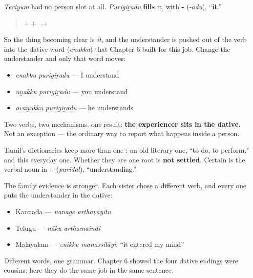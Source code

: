 \begin{grammarlens}[title={Grammar Lens: the last slot can say \textquotedblleft{}it\textquotedblright{}}]
\emph{Teriyum} had no person slot at all. \emph{Purigiṟadu} \textbf{fills} it, with \textbf{-} (\emph{-adu}), \textquotedblleft{}\textbf{it}.\textquotedblright{}

\begin{quote}
\textbf{} + \textbf{} + \textbf{} $\to$ \textbf{}
\end{quote}

So the thing becoming clear is \emph{it}, and the understander is pushed out of the verb into the dative word \textbf{} (\emph{enakku}) that Chapter 6 built for this job. Change the understander and only that word moves:

\begin{itemize}
\raggedright
  \item \emph{enakku purigiṟadu} — I understand
  \item \emph{uṉakku purigiṟadu} — you understand
  \item \emph{avaṉukku purigiṟadu} — he understands
\end{itemize}

Two verbs, two mechanisms, one result: \textbf{the experiencer sits in the dative.} Not an exception — the ordinary way to report what happens inside a person.
\end{grammarlens}

\begin{cousinweb}
Tamil's dictionaries keep more than one \textbf{}: an old literary one, \textquotedblleft{}to do, to perform,\textquotedblright{} and this everyday one. Whether they are one root is \textbf{not settled}. Certain is the verbal noun in \emph{-}: \textbf{} (\emph{puridal}), \textquotedblleft{}understanding.\textquotedblright{}

The family evidence is stronger. Each sister chose a different verb, and every one puts the understander in the dative:

\begin{itemize}
\raggedright
  \item Kannada \textbf{ } — \emph{nanage arthavāyitu}
  \item Telugu \textbf{ } — \emph{nāku arthamaindi}
  \item Malayalam \textbf{ } — \emph{enikku manassilāyi}, \textquotedblleft{}it entered my mind\textquotedblright{}
\end{itemize}

Different words, one grammar. Chapter 6 showed the four dative endings were cousins; here they do the same job in the same sentence.
\end{cousinweb}

